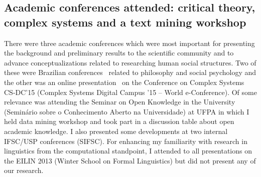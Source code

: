 \begin{apendicesenv}
\subsection{Academic conferences attended: critical theory, complex systems and a text mining workshop}
There were three academic conferences
which were most important for presenting the background and preliminary results to the scientific community
and to advance conceptualizations related to researching human social structures.
Two of these were Brazilian conferences~\cite{50uni,IICri} related to philosophy and social psychology
and the other was an online presentation~\cite{ccs15} on the Conference on Complex Systems CS-DC'15
(Complex Systems Digital Campus ’15 – World e-Conference).
Of some relevance was attending the Seminar on Open Knowledge in the University
(Seminário sobre o Conhecimento Aberto na Universidade) at UFPA
in which I held data mining workshop and took part in a discussion table about open academic knowledge.
I also presented some developments at two internal IFSC/USP conferences (SIFSC).
For enhancing my familiarity with research in linguistics from the computational standpoint,
I attended to all presentations on the EILIN 2013 (Winter School on Formal Linguistics)
but did not present any of our research.


\end{apendicesenv}
